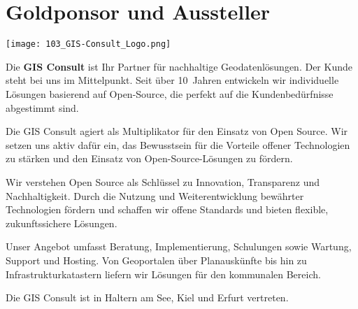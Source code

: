 \section*{Goldponsor und Aussteller}
\begin{flushright}
\texttt{[image: 103\_GIS-Consult\_Logo.png]}
\end{flushright}
\noindent
Die {\bfseries GIS Consult} ist Ihr Partner für nachhaltige Geodatenlösungen. Der Kunde steht bei uns im Mittelpunkt. Seit über 10~Jahren entwickeln wir individuelle Lösungen basierend auf Open-Source, die perfekt auf die Kundenbedürfnisse abgestimmt sind. 

\noindent
Die GIS Consult agiert als Multiplikator für den Einsatz von Open Source. Wir setzen uns aktiv dafür ein, das Bewusstsein für die Vorteile offener Technologien zu stärken und den Einsatz von Open-Source-Lösungen zu fördern.

\noindent
Wir verstehen Open Source als Schlüssel zu Innovation, Transparenz und Nachhaltigkeit. Durch die Nutzung und Weiterentwicklung bewährter Technologien fördern und schaffen wir offene Standards und bieten flexible, zukunftssichere Lösungen.

\noindent
Unser Angebot umfasst Beratung, Implementierung, Schulungen sowie Wartung, Support und Hosting. Von Geoportalen über Planauskünfte bis hin zu Infrastrukturkatastern liefern wir Lösungen für den kommunalen Bereich.

\noindent
Die GIS Consult ist in Haltern am See, Kiel und Erfurt vertreten.
